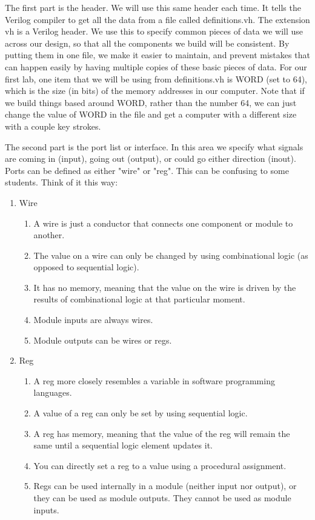 
The first part is the header.  We will use this same header each time.  It tells the Verilog compiler to get all the data from a file called definitions.vh.  The extension vh is a Verilog header.  We use this to specify common pieces of data we will use across our design, so that all the components we build will be consistent.  By putting them in one file, we make it easier to maintain, and prevent mistakes that can happen easily by having multiple copies of these basic pieces of data.  For our first lab, one item that we will be using from definitions.vh is WORD (set to 64), which is the size (in bits) of the memory addresses in our computer.  Note that if we build things based around WORD, rather than the number 64, we can just change the value of WORD in the file and get a computer with a different size with a couple key strokes.

The second part is the port list or interface.  In this area we specify what signals are coming in (input), going out (output), or could go either direction (inout).  Ports can be defined as either "wire" or "reg".  This can be confusing to some students.  Think of it this way: 
\begin{enumerate}
	\item Wire
	\begin{enumerate}
		\item A wire is just a conductor that connects one component or module to another.
		\item The value on a wire can only be changed by using combinational logic (as opposed to sequential logic).
		\item It has no memory, meaning that the value on the wire is driven by the results of combinational logic at that particular moment.
		\item Module inputs are always wires.
		\item Module outputs can be wires or regs.
	\end{enumerate}
	\item Reg
	\begin{enumerate}
		\item A reg more closely resembles a variable in software programming languages.
		\item A value of a reg can only be set by using sequential logic.
		\item A reg has memory, meaning that the value of the reg will remain the same until a sequential logic element updates it.
		\item You can directly set a reg to a value using a procedural assignment.
		\item Regs can be used internally in a module (neither input nor output), or they can be used as module outputs.  They cannot be used as module inputs. 
	\end{enumerate}
\end{enumerate}

